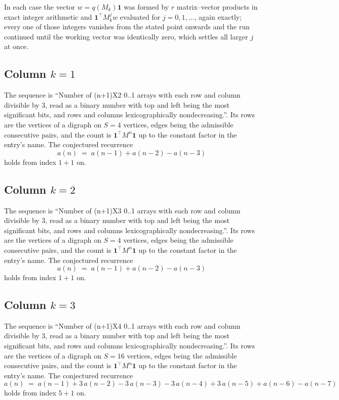 \documentclass[11pt,a4paper]{article}
\theoremstyle{plain}
\theoremstyle{definition}
\begin{document}
In each case the vector $w=q(M_k)\mathbf{1}$ was formed by $r$ matrix--vector products in
exact integer arithmetic and $\mathbf{1}^{\!\top}M_k^{j}w$ evaluated for $j=0,1,\dots$,
again exactly; every one of those integers vanishes from the stated point onwards and the run
continued until the working vector was identically zero, which settles all larger $j$ at once.

\subsection*{Column $k$$=1$}
The sequence is ``Number of (n+1)X2 0..1 arrays with each row and column divisible by 3, read as a binary number with top and left being the most significant bits, and rows and columns lexicographically nondecreasing.''. Its rows are the vertices of a digraph on
$S=4$ vertices, edges being the admissible consecutive pairs, and the count is
$\mathbf{1}^{\!\top}M^{n}\mathbf{1}$ up to the constant factor in the entry's name.
The conjectured recurrence
\[
a(n)\;=\;a(n-1) + a(n-2) - a(n-3)
\]
holds from index $1+1$ on.

\subsection*{Column $k$$=2$}
The sequence is ``Number of (n+1)X3 0..1 arrays with each row and column divisible by 3, read as a binary number with top and left being the most significant bits, and rows and columns lexicographically nondecreasing.''. Its rows are the vertices of a digraph on
$S=4$ vertices, edges being the admissible consecutive pairs, and the count is
$\mathbf{1}^{\!\top}M^{n}\mathbf{1}$ up to the constant factor in the entry's name.
The conjectured recurrence
\[
a(n)\;=\;a(n-1) + a(n-2) - a(n-3)
\]
holds from index $1+1$ on.

\subsection*{Column $k$$=3$}
The sequence is ``Number of (n+1)X4 0..1 arrays with each row and column divisible by 3, read as a binary number with top and left being the most significant bits, and rows and columns lexicographically nondecreasing.''. Its rows are the vertices of a digraph on
$S=16$ vertices, edges being the admissible consecutive pairs, and the count is
$\mathbf{1}^{\!\top}M^{n}\mathbf{1}$ up to the constant factor in the entry's name.
The conjectured recurrence
\[
a(n)\;=\;a(n-1) + 3\,a(n-2) - 3\,a(n-3) - 3\,a(n-4) + 3\,a(n-5) + a(n-6) - a(n-7)
\]
holds from index $5+1$ on.
\end{document}
